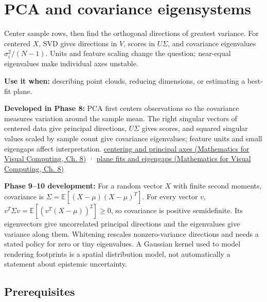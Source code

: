 \hypertarget{appendix-ad175ef3c5bf}{}\label{referencestart:appendix-ad175ef3c5bf}
\section{PCA and covariance eigensystems}\label{appendix-ad175ef3c5bf-pca-and-covariance-eigensystems}

Center sample rows, then find the orthogonal directions of greatest variance. For centered \(X\), SVD gives directions in \(V\), scores in \(U\Sigma\), and covariance eigenvalues \(\sigma_i^2/(N-1)\). Units and feature scaling change the question; near-equal eigenvalues make individual axes unstable.

\textbf{Use it when:} describing point clouds, reducing dimensions, or estimating a best-fit plane.

\textbf{Developed in Phase 8:} PCA first centers observations so the covariance measures variation around the sample mean. The right singular vectors of centered data give principal directions, \(U\Sigma\) gives scores, and squared singular values scaled by sample count give covariance eigenvalues; feature units and small eigengaps affect interpretation. \href{../02-Mathematics-for-Visual-Computing/main.pdf\#nameddest=02-foundations-ii-ch024-centered-measurements-reveal-principal-directions}{centering and principal axes (Mathematics for Visual Computing, Ch. 8)} · \href{../02-Mathematics-for-Visual-Computing/main.pdf\#nameddest=02-foundations-ii-ch024-plane-fits-eigengaps-and-interpretation-of-uncertain-components}{plane fits and eigengaps (Mathematics for Visual Computing, Ch. 8)}

\textbf{Phase 9--10 development:} For a random vector \(X\) with finite second moments, covariance is \(\Sigma=\mathbb E[(X-\mu)(X-\mu)^T]\). For every vector \(v\), \(v^T\Sigma v=\mathbb E[(v^T(X-\mu))^2]\geq0\), so covariance is positive semidefinite. Its eigenvectors give uncorrelated principal directions and the eigenvalues give variance along them. Whitening rescales nonzero-variance directions and needs a stated policy for zero or tiny eigenvalues. A Gaussian kernel used to model rendering footprints is a spatial distribution model, not automatically a statement about epistemic uncertainty.

\subsection{Prerequisites}\label{appendix-ad175ef3c5bf-prerequisites}

